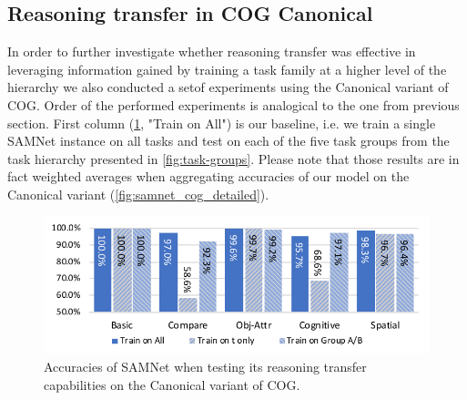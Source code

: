 



\subsection{Reasoning transfer in COG Canonical}
\label{sec:reasoning-transfer-cog}
In order to further investigate whether reasoning transfer was effective in leveraging information gained by training a task family at a higher level of the hierarchy we also conducted a setof  experiments using the Canonical variant of COG.
Order of the performed experiments is analogical to the one from previous section.
First column (\cref{fig:cog_reasoning_transfer}, "Train on All") is our baseline, i.e.
we train a single SAMNet instance on all tasks and test on each of the five task groups from the task hierarchy presented in \cref{fig:task-groups}.
Please note that those results are in fact weighted averages when aggregating accuracies of our model on the Canonical variant (\cref{fig:samnet_cog_detailed}).

\begin{figure}[htbp]
	\centering
	\includegraphics[width=\columnwidth]{../img/plots/cog_reasoning_transfer.pdf}
	\caption{Accuracies of SAMNet when testing its reasoning transfer capabilities on the Canonical variant of COG.}
	\label{fig:cog_reasoning_transfer}
\end{figure}

